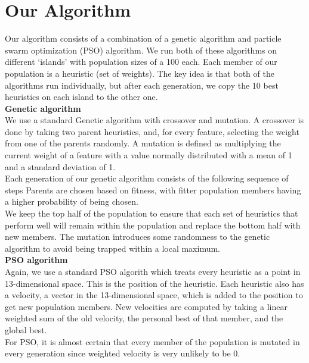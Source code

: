 \documentclass[12pt]{article}
\begin{document}
    \section{Our Algorithm}

    Our algorithm consists of a combination of a genetic algorithm and particle swarm
	optimization (PSO) algorithm. We run both of these algorithms on different ‘islands’
	with population sizes of a 100 each. Each member of our population is a heuristic (set of weights).
	The key idea is that both of the algorithms run individually, but after each generation, we
	copy the 10 best heuristics on each island to the other one.\\

	\textbf{Genetic algorithm}\\
	We use a standard Genetic algorithm with crossover and mutation. A crossover is
	done by taking two parent heuristics, and,
	for every feature, selecting the weight from one of the parents randomly. A
	mutation is defined as multiplying the current weight of a feature with
	a value normally distributed with a mean of 1 and a standard deviation of 1.\\
	Each generation of our genetic algorithm consists of the following sequence of steps
	Parents are chosen based on fitness, with fitter population members having a higher
	probability of being chosen.\\
	We keep the top half of the population to ensure that each set of heuristics
	that perform well will remain within the population and replace the bottom half with
	new members. The mutation introduces
	some randomness to the genetic algorithm to avoid being trapped within a local
	maximum.\\

	\textbf{PSO algorithm}\\
	Again, we use a standard PSO algorith which treats every heuristic as a point in 13-dimensional space.
	This is the position of the heuristic. Each heuristic also has a velocity,
	a vector in the 13-dimensional space, which is added to the position to get
	new population members. New velocities are computed by taking a linear weighted
	sum of the old velocity, the personal best of that member, and the global best.\\
	For PSO, it is almost certain that every member of the population is mutated
	in every generation since weighted velocity is very unlikely to be 0.\\
\end{document}
